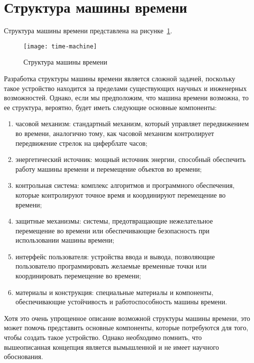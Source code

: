 \newpage

\section{Структура машины времени}

Структура машины времени представлена на рисунке~\ref{f:time-machine}.


\begin{figure}[ht]
	\centering
	\vspace{\toppaddingoffigure}
	\texttt{[image: time-machine]}
	\caption{Структура машины времени}
	\label{f:time-machine}
\end{figure}


Разработка структуры машины времени является сложной задачей, поскольку такое устройство находится за пределами существующих научных и инженерных возможностей. Однако, если мы предположим, что машина времени возможна, то ее структура, вероятно, будет иметь следующие основные компоненты:

\begin{enumerate}
	\item часовой механизм: стандартный механизм, который управляет передвижением во времени, аналогично тому, как часовой механизм контролирует передвижение стрелок на циферблате часов;

	\item энергетический источник: мощный источник энергии, способный обеспечить работу машины времени и перемещение объектов во времени;

	\item контрольная система: комплекс алгоритмов и программного обеспечения, которые контролируют точное время и координируют перемещение во времени;

	\item защитные механизмы: системы, предотвращающие нежелательное перемещение во времени или обеспечивающие безопасность при использовании машины времени;

	\item интерфейс пользователя: устройства ввода и вывода, позволяющие пользователю программировать желаемые временные точки или координировать перемещение во времени;

	\item материалы и конструкция: специальные материалы и компоненты, обеспечивающие устойчивость и работоспособность машины времени.
\end{enumerate}

Хотя это очень упрощенное описание возможной структуры машины времени, это может помочь представить основные компоненты, которые потребуются для того, чтобы создать такое устройство. Однако необходимо помнить, что вышеописанная концепция является вымышленной и не имеет научного обоснования.


